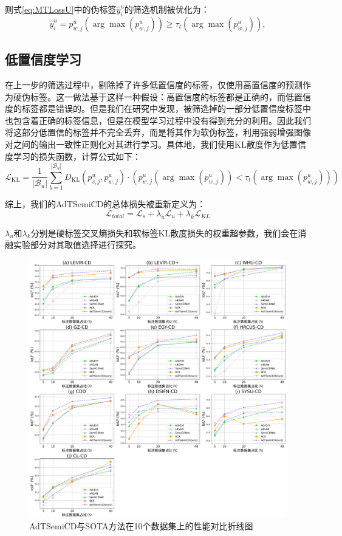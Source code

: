 \documentclass[lang=chs, degree=master, blindreview=false, adobe=false]{yanputhesis}
\begin{document}
则式\ref{eq:MTLossU}中的伪标签$\hat{y}_{i}^{u}$的筛选机制被优化为：
\begin{equation}
  \label{eq:Adath_argmax}
  \hat{y}_{i}^{u}=p_{w, j}^{u}(\arg \max \left(p_{w, j}^{u} \right)) \ge \tau_{t}\left(\arg \max \left(p_{w, j}^{u} \right)\right),
\end{equation}
\subsection{低置信度学习}
在上一步的筛选过程中，剔除掉了许多低置信度的标签，仅使用高置信度的预测作为硬伪标签。这一做法基于这样一种假设：高置信度的标签都是正确的，而低置信度的标签都是错误的。但是我们在研究中发现，被筛选掉的一部分低置信度标签中也包含着正确的标签信息，但是在模型学习过程中没有得到充分的利用。因此我们将这部分低置信的标签并不完全丢弃，而是将其作为软伪标签，利用强弱增强图像对之间的输出一致性正则化对其进行学习。具体地，我们使用KL散度作为低置信度学习的损失函数，计算公式如下：
\begin{equation}
  \label{eq:Adath_lossSoft}
  \mathcal{L}_{\mathrm{KL}}=\frac{1}{\left|\mathcal{B}_{u}\right|} \sum_{b=1}^{\left|\mathcal{B}_{u}\right|}D_{\mathrm{KL}}\left(p_{s, j}^{u}, p_{w, j}^{u}\right) \cdot \left(p_{w, j}^{u}(\arg \max \left(p_{w, j}^{u} \right))<\tau_{t}\left(\arg \max \left(p_{w, j}^{u}\right)\right)\right)
\end{equation}

综上，我们的AdTSemiCD的总体损失被重新定义为：
\begin{equation}
  \label{eq:Adath_losstotal}
  \mathcal{L}_{total}=\mathcal{L}_{s}+\lambda_{u} \mathcal{L}_{u}+\lambda_{k} \mathcal{L}_{KL}
\end{equation}

$\lambda_{u}$和$\lambda_{k}$分别是硬标签交叉熵损失和软标签KL散度损失的权重超参数，我们会在消融实验部分对其取值选择进行探究。
\begin{figure}[htb]
  \centering
  \includegraphics[scale=0.30]{images/AdTvis_plot.png}
  \caption{
    AdTSemiCD与SOTA方法在10个数据集上的性能对比折线图
  }
  \label{fig:AdTiou_plot}
\end{figure}
\end{document}
